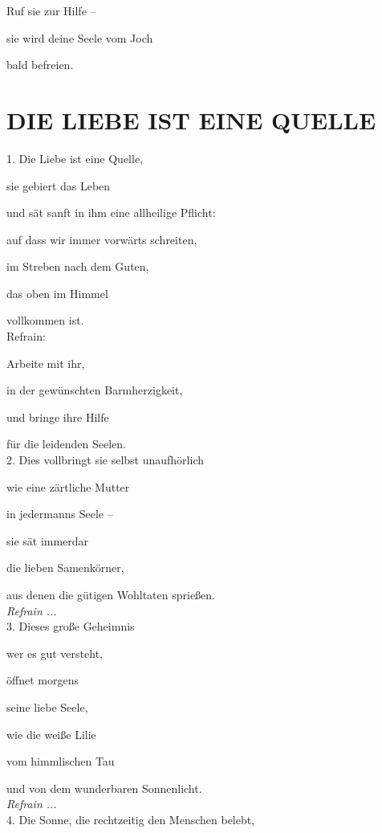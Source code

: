 \documentclass[11pt,a5paper,twoside]{article}
\begin{document}
Ruf sie zur Hilfe --
 
sie wird deine Seele vom Joch
 
bald befreien.


\section[Die Liebe ist eine Quelle]{DIE LIEBE IST EINE QUELLE}

1. Die Liebe ist eine Quelle, 

sie gebiert das Leben

und sät sanft in ihm eine allheilige Pflicht:

auf dass wir immer vorwärts schreiten, 

im Streben nach dem Guten,

das oben im Himmel 

vollkommen ist. \\


Refrain:

Arbeite mit ihr, 

in der gewünschten Barmherzigkeit,

und bringe ihre Hilfe
 
für die leidenden Seelen. \\


2. Dies vollbringt sie selbst unaufhörlich

wie eine zärtliche Mutter

in jedermanns Seele --

sie sät immerdar

die lieben Samenkörner,

aus denen die gütigen Wohltaten sprießen.\\

\textit{Refrain ...}\\

3. Dieses große Geheimnis

wer es gut versteht,

öffnet morgens

seine liebe Seele,

wie die weiße Lilie

vom himmlischen Tau

und von dem wunderbaren Sonnenlicht. \\

\textit{Refrain ...}\\

4. Die Sonne, die rechtzeitig den Menschen belebt,
\end{document}
